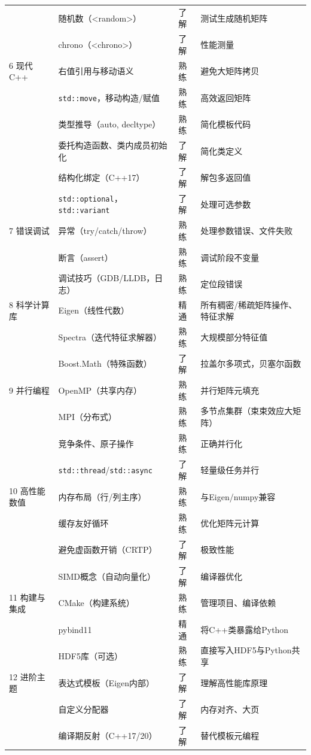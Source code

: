 \documentclass[12pt,a4paper]{article}
\begin{document}
{\begin{longtable}{p{3.5cm}p{2.5cm}p{1.8cm}p{7cm}}
& 随机数（<random>） & 了解 & 测试生成随机矩阵 \\
& chrono（<chrono>） & 了解 & 性能测量 \\
\midrule
6 现代C++ & 右值引用与移动语义 & 熟练 & 避免大矩阵拷贝 \\
& \texttt{std::move}，移动构造/赋值 & 熟练 & 高效返回矩阵 \\
& 类型推导（auto, decltype） & 熟练 & 简化模板代码 \\
& 委托构造函数、类内成员初始化 & 了解 & 简化类定义 \\
& 结构化绑定（C++17） & 了解 & 解包多返回值 \\
& \texttt{std::optional}，\texttt{std::variant} & 了解 & 处理可选参数 \\
\midrule
7 错误调试 & 异常（try/catch/throw） & 熟练 & 处理参数错误、文件失败 \\
& 断言（assert） & 熟练 & 调试阶段不变量 \\
& 调试技巧（GDB/LLDB，日志） & 熟练 & 定位段错误 \\
\midrule
8 科学计算库 & Eigen（线性代数） & 精通 & 所有稠密/稀疏矩阵操作、特征求解 \\
& Spectra（迭代特征求解器） & 熟练 & 大规模部分特征值 \\
& Boost.Math（特殊函数） & 了解 & 拉盖尔多项式，贝塞尔函数 \\
\midrule
9 并行编程 & OpenMP（共享内存） & 熟练 & 并行矩阵元填充 \\
& MPI（分布式） & 熟练 & 多节点集群（束束效应大矩阵） \\
& 竞争条件、原子操作 & 熟练 & 正确并行化 \\
& \texttt{std::thread}/\texttt{std::async} & 了解 & 轻量级任务并行 \\
\midrule
10 高性能数值 & 内存布局（行/列主序） & 熟练 & 与Eigen/numpy兼容 \\
& 缓存友好循环 & 熟练 & 优化矩阵元计算 \\
& 避免虚函数开销（CRTP） & 了解 & 极致性能 \\
& SIMD概念（自动向量化） & 了解 & 编译器优化 \\
\midrule
11 构建与集成 & CMake（构建系统） & 熟练 & 管理项目、编译依赖 \\
& pybind11 & 精通 & 将C++类暴露给Python \\
& HDF5库（可选） & 熟练 & 直接写入HDF5与Python共享 \\
\midrule
12 进阶主题 & 表达式模板（Eigen内部） & 了解 & 理解高性能库原理 \\
& 自定义分配器 & 了解 & 内存对齐、大页 \\
& 编译期反射（C++17/20） & 了解 & 替代模板元编程 \\
\bottomrule
\end{longtable}
}
\end{document}
